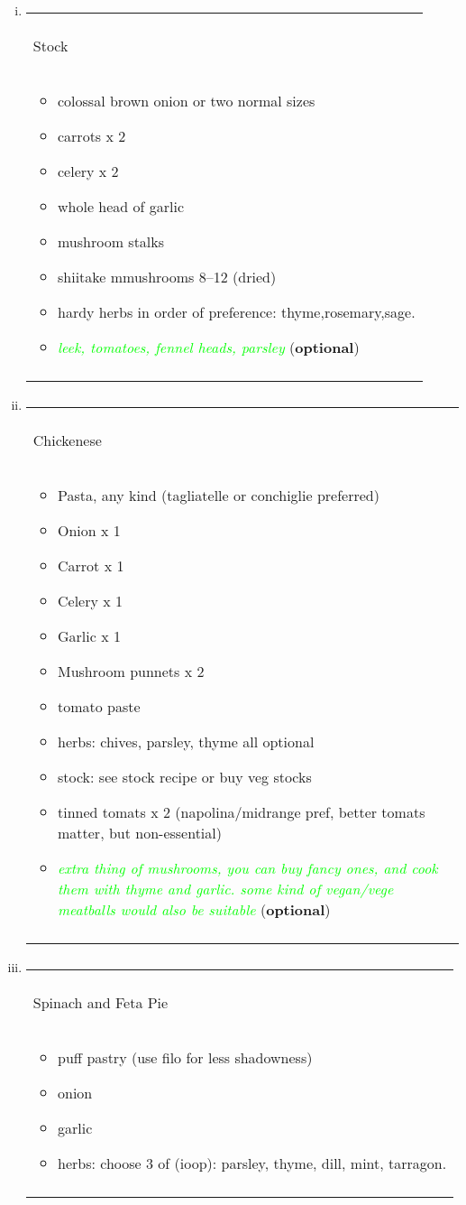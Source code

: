 \documentclass[a4paper,12pt]{article}
\numberwithin{equation}{section} %
\newcommand{\optional}[1]{\textcolor{lime}{\textit{#1}} (\textbf{optional})}
\newenvironment{recipe}[1][Dubious Food]
    {\begin{center}%
    \begin{tabular}{|p{0.8\textwidth}|}%
    \hline\\[-3ex]
    \begin{center}{\Large{#1}}\end{center}\\
    \hline
    \begin{itemize}%
    }
    { 
    \end{itemize}%
    \\\\\hline%
    \end{tabular}%
    \end{center}
    }
\begin{document}
\begin{enumerate}[(i)]
    \item \begin{recipe}[Stock]
            \item colossal brown onion or two normal sizes
            \item carrots x 2
            \item celery x 2
            \item whole head of garlic
            \item mushroom stalks
            \item shiitake mmushrooms 8--12 (dried)
            \item hardy herbs in order of preference: thyme,rosemary,sage.
            \item \optional{leek, tomatoes, fennel heads, parsley}
        \end{recipe}
    \item  \begin{recipe}[Chickenese]
            \item Pasta, any kind (tagliatelle or conchiglie preferred)
            \item Onion x 1
            \item Carrot x 1
            \item Celery x 1
            \item Garlic x 1
            \item Mushroom punnets x 2
            \item tomato paste
            \item herbs: chives, parsley, thyme all optional
            \item stock: see stock recipe or buy veg stocks
            \item tinned tomats x 2 (napolina/midrange pref, better tomats matter, but non-essential)
            \item \optional{extra thing of mushrooms, you can buy fancy ones, and cook them with thyme and garlic. some kind of vegan/vege meatballs would also be suitable}
    \end{recipe}
    \item \begin{recipe}[Spinach and Feta Pie]
        \item puff pastry (use filo for less shadowness)
        \item onion
        \item garlic
        \item herbs: choose 3 of (ioop): parsley, thyme, dill, mint, tarragon. 

\end{recipe}
\end{enumerate}
\end{document}
